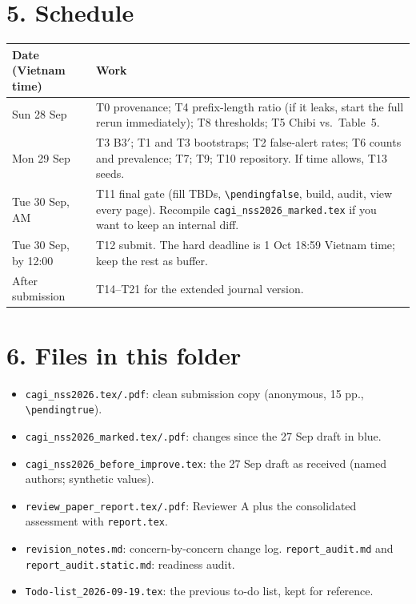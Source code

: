 \documentclass[11pt,a4paper]{article}
\begin{document}
\section*{5. Schedule}
\begin{center}\small
\begin{tabular}{@{}lp{13cm}@{}}
\toprule
Date (Vietnam time) & Work \\
\midrule
Sun 28 Sep & T0 provenance; T4 prefix-length ratio (if it leaks, start the full rerun immediately); T8 thresholds; T5 Chibi vs.\ Table~5. \\
Mon 29 Sep & T3 B3$'$; T1 and T3 bootstraps; T2 false-alert rates; T6 counts and prevalence; T7; T9; T10 repository. If time allows, T13 seeds. \\
Tue 30 Sep, AM & T11 final gate (fill TBDs, \verb|\pendingfalse|, build, audit, view every page). Recompile \texttt{cagi\_nss2026\_marked.tex} if you want to keep an internal diff. \\
Tue 30 Sep, by 12:00 & T12 submit. The hard deadline is 1 Oct 18:59 Vietnam time; keep the rest as buffer. \\
After submission & T14--T21 for the extended journal version. \\
\bottomrule
\end{tabular}
\end{center}

\section*{6. Files in this folder}
\begin{itemize}[leftmargin=*]
\item \texttt{cagi\_nss2026.tex/.pdf}: clean submission copy (anonymous, 15 pp., \verb|\pendingtrue|).
\item \texttt{cagi\_nss2026\_marked.tex/.pdf}: changes since the 27 Sep draft in blue.
\item \texttt{cagi\_nss2026\_before\_improve.tex}: the 27 Sep draft as received (named authors; synthetic values).
\item \texttt{review\_paper\_report.tex/.pdf}: Reviewer A plus the consolidated assessment with \texttt{report.tex}.
\item \texttt{revision\_notes.md}: concern-by-concern change log. \texttt{report\_audit.md} and \texttt{report\_audit.static.md}: readiness audit.
\item \texttt{Todo-list\_2026-09-19.tex}: the previous to-do list, kept for reference.
\end{itemize}
\end{document}
